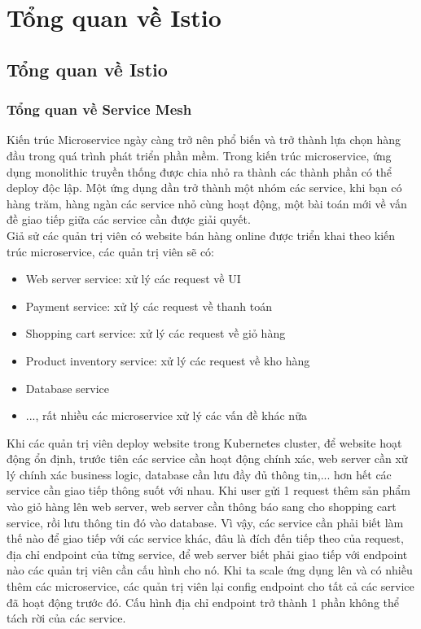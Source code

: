 \documentclass[12pt,a4paper]{report}
\begin{document}
\chapter{Tổng quan về Istio}
	\section{Tổng quan về Istio}
		\subsection{Tổng quan về Service Mesh}
			\hspace{0.6cm}Kiến trúc Microservice ngày càng trở nên phổ biến và trở thành lựa chọn hàng đầu trong quá trình phát triển phần mềm. Trong kiến trúc microservice, ứng dụng monolithic truyền thống được chia nhỏ ra thành các thành phần có thể deploy độc lập. Một ứng dụng dần trở thành một nhóm các service, khi bạn có hàng trăm, hàng ngàn các service nhỏ cùng hoạt động, một bài toán mới về vấn đề giao tiếp giữa các service cần được giải quyết.\\
			
			Giả sử các quản trị viên có website bán hàng online được triển khai theo kiến trúc microservice, các quản trị viên sẽ có:
			\begin{itemize}
				\item Web server service: xử lý các request về UI
				\item Payment service: xử lý các request về thanh toán
				\item Shopping cart service: xử lý các request về giỏ hàng
				\item Product inventory service: xử lý các request về kho hàng
				\item Database service
				\item ..., rất nhiều các microservice xử lý các vấn đề khác nữa
			\end{itemize}
		
		Khi các quản trị viên deploy website trong Kubernetes cluster, để website hoạt động ổn định, trước tiên các service cần hoạt động chính xác, web server cần xử lý chính xác business logic, database cần lưu đầy đủ thông tin,... hơn hết các service cần giao tiếp thông suốt với nhau. Khi user gửi 1 request thêm sản phẩm vào giỏ hàng lên web server, web server cần thông báo sang cho shopping cart service, rồi lưu thông tin đó vào database. Vì vậy, các service cần phải biết làm thế nào để giao tiếp với các service khác, đâu là đích đến tiếp theo của request, địa chỉ endpoint của từng service, để web server biết phải giao tiếp với endpoint nào các quản trị viên cần cấu hình cho nó. Khi ta scale ứng dụng lên và có nhiều thêm các microservice, các quản trị viên lại config endpoint cho tất cả các service đã hoạt động trước đó. Cấu hình địa chỉ endpoint trở thành 1 phần không thể tách rời của các service.
		
\end{document}
